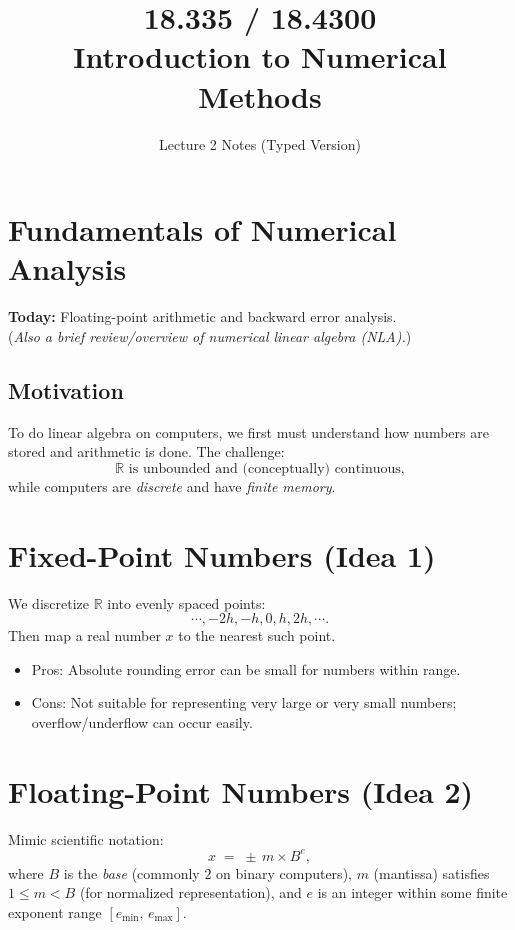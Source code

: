 \documentclass[12pt]{article}
\begin{document}
\title{18.335 / 18.4300 \\ Introduction to Numerical Methods}
\author{Lecture 2 Notes (Typed Version)}
\date{}
\maketitle

\section*{Fundamentals of Numerical Analysis}

\textbf{Today:} Floating-point arithmetic and backward error analysis. \\
(\textit{Also a brief review/overview of numerical linear algebra (NLA).})

\subsection*{Motivation}

To do linear algebra on computers, we first must understand how numbers are stored and arithmetic is done. The challenge:
\[
\mathbb{R} \text{ is unbounded and (conceptually) continuous,}
\]
while computers are \emph{discrete} and have \emph{finite memory}.

\section*{Fixed-Point Numbers (Idea 1)}

We discretize $\mathbb{R}$ into evenly spaced points:
\[
\cdots, -2h, -h, 0, h, 2h, \cdots.
\]
Then map a real number $x$ to the nearest such point.

\begin{itemize}
    \item Pros: Absolute rounding error can be small for numbers within range.
    \item Cons: Not suitable for representing very large or very small numbers; overflow/underflow can occur easily.
\end{itemize}

\section*{Floating-Point Numbers (Idea 2)}

Mimic scientific notation:
\[
x \;=\; \pm \, m \times B^e,
\]
where $B$ is the \emph{base} (commonly $2$ on binary computers), $m$ (mantissa) satisfies $1 \le m < B$ (for normalized representation), and $e$ is an integer within some finite exponent range $[e_{\min},\, e_{\max}]$.
\end{document}
